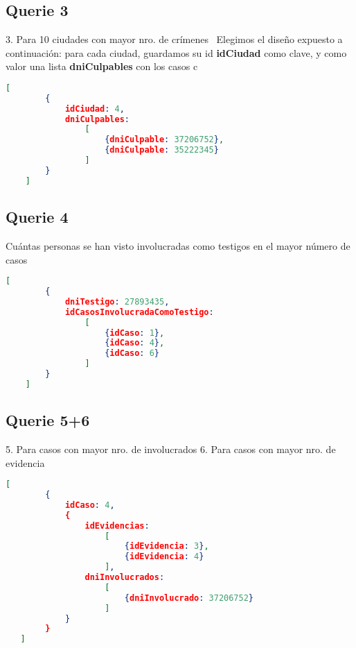 \documentclass[11pt, a4paper]{article}
\begin{document}
\subsection{Querie 3}
3. Para 10 ciudades con mayor nro. de crímenes \
Elegimos el diseño expuesto a continuación: para cada ciudad, guardamos su id \textbf{idCiudad} como clave, y como valor una lista \textbf{dniCulpables} con los casos c 
\begin{lstlisting}[language=json]
	[
		{
			idCiudad: 4,
			dniCulpables:
				[
					{dniCulpable: 37206752}, 
					{dniCulpable: 35222345}
				]
		}
	]
\end{lstlisting}

\subsection{Querie 4}
Cuántas personas se han visto involucradas como testigos en el mayor número de casos
\begin{lstlisting}[language=json]
	[
		{
			dniTestigo: 27893435,
			idCasosInvolucradaComoTestigo:
				[
					{idCaso: 1},
					{idCaso: 4},
					{idCaso: 6}
				]
		}
	]
\end{lstlisting}

\subsection{Querie 5+6}
5. Para casos con mayor nro. de involucrados
6. Para casos con mayor nro. de evidencia
\begin{lstlisting}[language=json]
   [
   		{
   			idCaso: 4,
	   		{
	   			idEvidencias: 
	   				[	
	   					{idEvidencia: 3},
	   					{idEvidencia: 4}
	   				],
	   			dniInvolucrados:
	   				[
	   					{dniInvolucrado: 37206752}
	   				]
	   		}
	   	}
   ]
\end{lstlisting}

\end{document}
